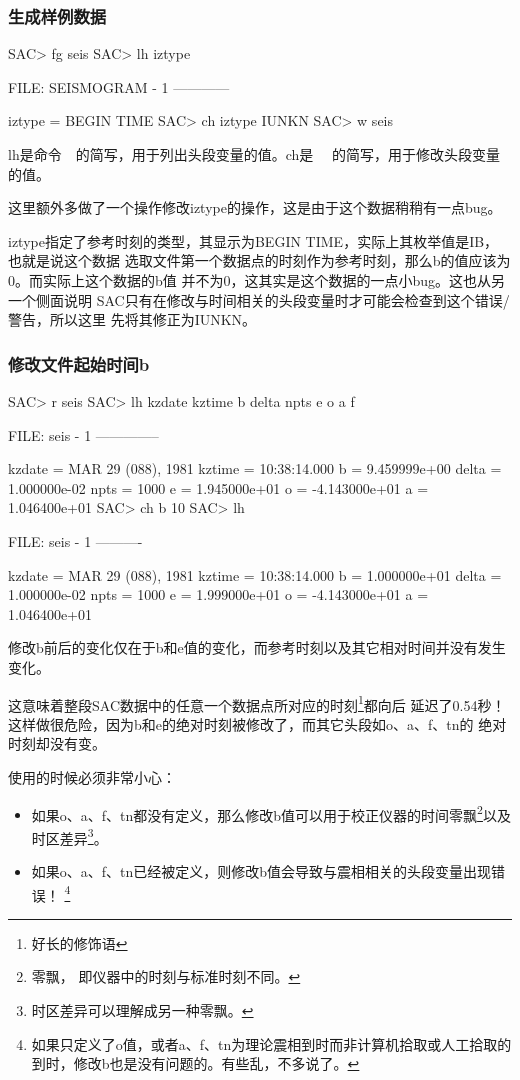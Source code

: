 \subsubsection{生成样例数据}
\begin{SACCode}
SAC> fg seis
SAC> lh iztype

  FILE: SEISMOGRAM - 1
   ------------

    iztype = BEGIN TIME
SAC> ch iztype IUNKN
SAC> w seis
\end{SACCode}
lh是命令~~的简写，用于列出头段变量的值。ch是~~
的简写，用于修改头段变量的值。

这里额外多做了一个操作修改iztype的操作，这是由于这个数据稍稍有一点bug。

iztype指定了参考时刻的类型，其显示为BEGIN TIME，实际上其枚举值是IB，也就是说这个数据
选取文件第一个数据点的时刻作为参考时刻，那么b的值应该为0。而实际上这个数据的b值
并不为0，这其实是这个数据的一点小bug。这也从另一个侧面说明
SAC只有在修改与时间相关的头段变量时才可能会检查到这个错误/警告，所以这里
先将其修正为IUNKN。

\subsubsection{修改文件起始时间b}
\begin{SACCode}
SAC> r seis
SAC> lh kzdate kztime b delta npts e o a f

  FILE: seis - 1
 --------------

     kzdate = MAR 29 (088), 1981
     kztime = 10:38:14.000
          b = 9.459999e+00
      delta = 1.000000e-02
       npts = 1000
          e = 1.945000e+01
          o = -4.143000e+01
          a = 1.046400e+01
SAC> ch b 10
SAC> lh

  FILE: seis - 1
   ----------

     kzdate = MAR 29 (088), 1981
     kztime = 10:38:14.000
          b = 1.000000e+01
      delta = 1.000000e-02
       npts = 1000
          e = 1.999000e+01
          o = -4.143000e+01
          a = 1.046400e+01
\end{SACCode}

修改b前后的变化仅在于b和e值的变化，而参考时刻以及其它相对时间并没有发生变化。

这意味着整段SAC数据中的任意一个数据点所对应的时刻\footnote{好长的修饰语}都向后
延迟了0.54秒！这样做很危险，因为b和e的绝对时刻被修改了，而其它头段如o、a、f、tn的
绝对时刻却没有变。

使用的时候必须非常小心：
\begin{itemize}
\item 如果o、a、f、tn都没有定义，那么修改b值可以用于校正仪器的时间零飘\footnote{零飘，
    即仪器中的时刻与标准时刻不同。}以及时区差异\footnote{时区差异可以理解成另一种零飘。}。
\item 如果o、a、f、tn已经被定义，则修改b值会导致与震相相关的头段变量出现错误！
    \footnote{如果只定义了o值，或者a、f、tn为理论震相到时而非计算机拾取或人工拾取的
    到时，修改b也是没有问题的。有些乱，不多说了。}
\end{itemize}

